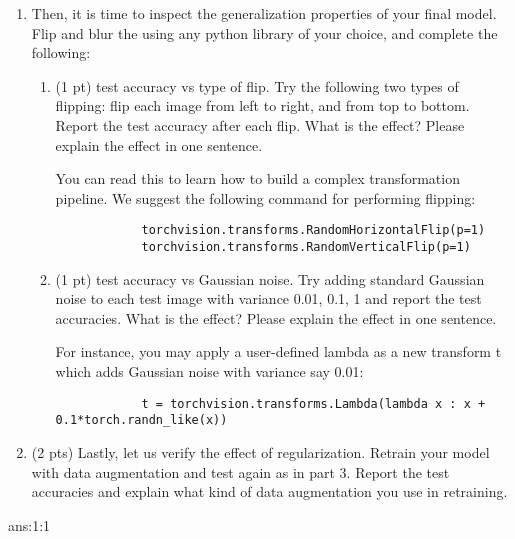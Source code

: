 \documentclass{tron}
\newcommand{\mref}[1]{\underline{\textbf{\hypersetup{linkcolor=orange}\Cref{#1}\hypersetup{linkcolor=blue}}}}
\begin{document}
\begin{exercise}{}
\begin{enumerate}
		\ans{\mref{ans:1:1}}
		
		\item Then, it is time to inspect the generalization properties of your final model. Flip and blur the  using any python library of your choice, and complete the following:		
		\begin{enumerate}[resume]
			\item (1 pt) test accuracy vs type of flip. Try the following two types of flipping: flip each image from left to right, and from top to bottom. Report the test accuracy after each flip. What is the effect? Please explain the effect in one sentence.
			
			You can read this \href{https://pytorch.org/vision/stable/transforms.html}{} to learn how to build a complex transformation pipeline. We suggest the following command for performing flipping: 
			\begin{verbatim}
			torchvision.transforms.RandomHorizontalFlip(p=1)
			torchvision.transforms.RandomVerticalFlip(p=1)
			\end{verbatim}
			
			\ans{}
			
			\item (1 pt) test accuracy vs Gaussian noise. Try adding standard Gaussian noise to each test image with variance 0.01, 0.1, 1 and report the test accuracies. What is the effect? Please explain the effect in one sentence.
			
			For instance, you may apply a user-defined lambda as a new transform t which adds Gaussian noise with variance say 0.01: 
			\begin{verbatim}
			t = torchvision.transforms.Lambda(lambda x : x + 0.1*torch.randn_like(x))
			\end{verbatim}
			
			\ans{}
		\end{enumerate} 
		
		\item (2 pts) Lastly, let us verify the effect of regularization. Retrain your model with data augmentation and test again as in part 3. Report the test accuracies and explain what kind of data augmentation you use in retraining.
		
		\ans{}
		
	\end{enumerate}
	
\end{exercise}
\begin{answer}{ans:1:1}


\end{answer}
\end{document}

